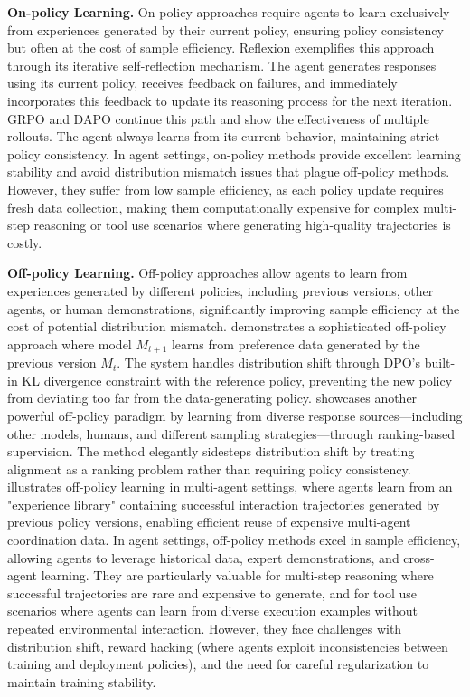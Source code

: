 \textbf{On-policy Learning.}
On-policy approaches require agents to learn exclusively from experiences generated by their current policy, ensuring policy consistency but often at the cost of sample efficiency. Reflexion \citep{shinn2023reflexion} exemplifies this approach through its iterative self-reflection mechanism. The agent generates responses using its current policy, receives feedback on failures, and immediately incorporates this feedback to update its reasoning process for the next iteration. GRPO \citep{shao2024deepseekmath} and DAPO \citep{yu2025dapo} continue this path and show the effectiveness of multiple rollouts. The agent always learns from its current behavior, maintaining strict policy consistency. In agent settings, on-policy methods provide excellent learning stability and avoid distribution mismatch issues that plague off-policy methods. However, they suffer from low sample efficiency, as each policy update requires fresh data collection, making them computationally expensive for complex multi-step reasoning or tool use scenarios where generating high-quality trajectories is costly.

\textbf{Off-policy Learning.}
Off-policy approaches allow agents to learn from experiences generated by different policies, including previous versions, other agents, or human demonstrations, significantly improving sample efficiency at the cost of potential distribution mismatch. 
 \cite{yuan2401self} demonstrates a sophisticated off-policy approach where model $M_{t+1}$ learns from preference data generated by the previous version $M_t$. The system handles distribution shift through DPO's built-in KL divergence constraint with the reference policy, preventing the new policy from deviating too far from the data-generating policy. 
\cite{yuan2023rrhf} showcases another powerful off-policy paradigm by learning from diverse response sources—including other models, humans, and different sampling strategies—through ranking-based supervision. The method elegantly sidesteps distribution shift by treating alignment as a ranking problem rather than requiring policy consistency. 
\cite{zhao2025sirius} illustrates off-policy learning in multi-agent settings, where agents learn from an "experience library" containing successful interaction trajectories generated by previous policy versions, enabling efficient reuse of expensive multi-agent coordination data. 
In agent settings, off-policy methods excel in sample efficiency, allowing agents to leverage historical data, expert demonstrations, and cross-agent learning. They are particularly valuable for multi-step reasoning where successful trajectories are rare and expensive to generate, and for tool use scenarios where agents can learn from diverse execution examples without repeated environmental interaction. However, they face challenges with distribution shift, reward hacking (where agents exploit inconsistencies between training and deployment policies), and the need for careful regularization to maintain training stability.

